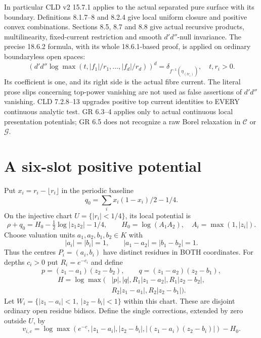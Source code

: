 \documentclass[11pt]{article}
\newcommand{\DD}{d'd''}
\newcommand{\C}{\mathcal C}
\newcommand{\G}{\mathcal G}
\begin{document}
In particular CLD v2 15.7.1 applies to the actual separated pure surface
with its boundary. Definitions 8.1.7--8 and 8.2.4 give local uniform
closure and positive convex combinations. Sections 8.5, 8.7 and 8.8 give
actual recursive products, multilinearity, fixed-current restriction and
smooth $\DD$-null invariance. The precise 18.6.2 formula, with its whole
18.6.1-based proof, is applied on ordinary boundaryless open spaces:
\[
 (\DD\log\max(t,|f_1|/r_1,\ldots,|f_d|/r_d))^d
       =\delta_{f^{-1}(\eta_{(tr_i)})},\quad t,r_i>0.
\]
Its coefficient is one, and its right side is the actual fibre current.
The literal prose slips concerning top-power vanishing are not used as
false assertions of $\DD$ vanishing. CLD 7.2.8--13 upgrades positive top
current identities to EVERY continuous analytic test. GR 6.3--4 applies
only to actual continuous local presentation potentials; GR 6.5 does not
recognize a raw Borel relaxation in $\C$ or $\G$.

\section{A six-slot positive potential}
Put $x_i=r_i-\lfloor r_i\rfloor$ in the periodic baseline
\[
 q_0=\sum_i x_i(1-x_i)/2-1/4.
\]
On the injective chart $U=\{|r_i|<1/4\}$, its local potential is
\[
 \rho+q_0=H_0-\tfrac12\log|z_1z_2|-1/4,
 \qquad H_0=\log(A_1A_2),\quad A_i=\max(1,|z_i|).
\]
Choose valuation units $a_1,a_2,b_1,b_2\in K$ with
\[
 |a_i|=|b_i|=1,\qquad |a_1-a_2|=|b_1-b_2|=1.
\]
Thus the centres $P_i=(a_i,b_i)$ have distinct residues in BOTH
coordinates. For depths $c_i>0$ put $R_i=e^{-c_i}$ and define
\[
 p=(z_1-a_1)(z_2-b_2),\qquad q=(z_1-a_2)(z_2-b_1),
\]
\begin{align*}
 H=\log\max\big(&|p|,|q|,R_1|z_1-a_2|,R_1|z_2-b_2|,\\
              &R_2|z_1-a_1|,R_2|z_2-b_1|\big).
\end{align*}
Let $W_i=\{|z_1-a_i|<1,\ |z_2-b_i|<1\}$ within this chart.
These are disjoint ordinary open residue bidiscs. Define the single
corrections, extended by zero outside $U$, by
\[
 v_{i,c}=\log\max(e^{-c},|z_1-a_i|,|z_2-b_i|,
                  |(z_1-a_i)(z_2-b_i)|)-H_0.
\]
\end{document}
